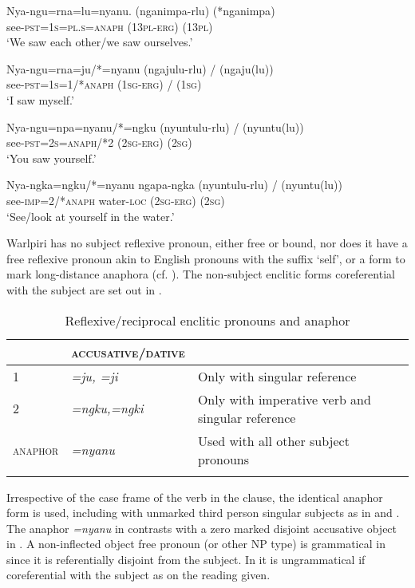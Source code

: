 \documentclass[output=paper]{../langscibook}
\begin{document}
\ea%
    \label{ex:laughren:9}

\ea
\label{ex:laughren:9a}
\gll Nya-ngu=rna=lu=nyanu. ({nganimpa-rlu})  (*{nganimpa})\\
    see-\textsc{pst=1s=pl.s=anaph}  (13\textsc{pl-erg)}   (1\textsc{3pl})\\
\glt `We saw each other/we saw ourselves.'

\ex
\label{ex:laughren:9b}
\gll Nya-ngu=rna=ju/*=nyanu (ngajulu-rlu) {/} ({ngaju(lu)})\\
    see-\textsc{pst=1s=1/*anaph}  (\textsc{1sg-erg}) {/} (\textsc{1sg)}\\
\glt `I saw myself.'

\ex
\label{ex:laughren:9c}
\gll Nya-ngu=npa=nyanu/*=ngku ({nyuntulu-rlu}) /  ({nyuntu(lu)})\\
    see-\textsc{pst=2s=anaph/*2}  (\textsc{2sg-erg)} { } (\textsc{2sg})\\
\glt `You saw yourself.'


\ex
\label{ex:laughren:9d}
\gll Nya-ngka=ngku/*=nyanu  ngapa-ngka ({nyuntulu-rlu}) / (nyuntu(lu))\\
    see-\textsc{imp=2/*anaph}  water-\textsc{loc}  (\textsc{2sg-erg})   { }   (\textsc{2sg)}\\
\glt `See/look at yourself in the water.'
\z
\z


Warlpiri has no subject reflexive pronoun, either free or bound, nor does it have a free reflexive pronoun akin to English pronouns with the suffix `self', or a form to mark long-distance anaphora (cf. \citealt{Giorgi2007}). The non-subject enclitic forms coreferential with the subject are set out in .

\begin{table}
\begin{tabularx}{0.7\textwidth}{p{1.3cm}XX} 
\lsptoprule
& \textsc{accusative/dative} & \\
\hline
1 & \textit{=ju, =ji} & Only with singular reference\\
2 & \textit{=ngku,=ngki} & Only with imperative verb and singular reference\\
\textsc{anaphor} & \textit{=nyanu} & Used with all other subject pronouns\\
\lspbottomrule
\end{tabularx}
\label{tab:laughren:2}
\caption{Reflexive/reciprocal enclitic pronouns and anaphor}
\end{table}

Irrespective of the case frame of the verb in the clause, the identical anaphor form is used, including with unmarked third person singular subjects as in  and . The anaphor \textit{=nyanu} in  contrasts with a zero marked disjoint accusative object in . A non-inflected object free pronoun (or other NP type) is grammatical in  since it is referentially disjoint from the subject. In  it is ungrammatical if coreferential with the subject as on the reading given.
\end{document}
